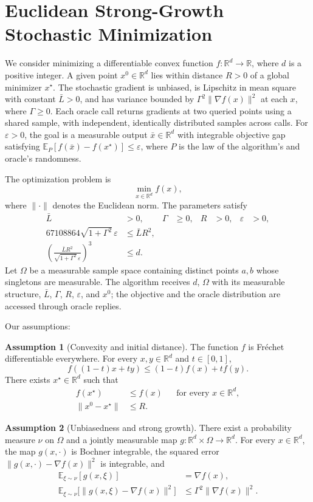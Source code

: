 \documentclass[10pt]{article}
\theoremstyle{definition}
\newtheorem{assumption}{Assumption}
\begin{document}
\section*{Euclidean Strong-Growth Stochastic Minimization}
We consider minimizing a differentiable convex function $f:\mathbb{R}^d\to\mathbb{R}$, where $d$ is a positive integer. A given point $x^0\in\mathbb{R}^d$ lies within distance $R>0$ of a global minimizer $x^\star$. The stochastic gradient is unbiased, is Lipschitz in mean square with constant $\bar{L}>0$, and has variance bounded by $\Gamma^2\|\nabla f(x)\|^2$ at each $x$, where $\Gamma\geq0$. Each oracle call returns gradients at two queried points using a shared sample, with independent, identically distributed samples across calls. For $\varepsilon>0$, the goal is a measurable output $\bar{x}\in\mathbb{R}^d$ with integrable objective gap satisfying $\mathbb{E}_{P}[f(\bar{x})-f(x^\star)]\leq\varepsilon$, where $P$ is the law of the algorithm's and oracle's randomness.

The optimization problem is
\[
\min_{x\in\mathbb{R}^d} f(x),
\]
where $\|\cdot\|$ denotes the Euclidean norm. The parameters satisfy
\[
\begin{aligned}
\bar{L}&>0, & \Gamma&\geq0, & R&>0, & \varepsilon&>0,\\
67108864\sqrt{1+\Gamma^2}\,\varepsilon
&\leq \bar{L}R^2,\\
\left(\frac{\bar{L}R^2}{\sqrt{1+\Gamma^2}\,\varepsilon}\right)^3
&\leq d.
\end{aligned}
\]
Let $\Omega$ be a measurable sample space containing distinct points $a,b$ whose singletons are measurable. The algorithm receives $d$, $\Omega$ with its measurable structure, $\bar{L}$, $\Gamma$, $R$, $\varepsilon$, and $x^0$; the objective and the oracle distribution are accessed through oracle replies.

Our assumptions:
\begin{assumption}[Convexity and initial distance]
The function $f$ is Fr\'echet differentiable everywhere. For every $x,y\in\mathbb{R}^d$ and $t\in[0,1]$,
\[
f((1-t)x+ty)\leq (1-t)f(x)+t f(y).
\]
There exists $x^\star\in\mathbb{R}^d$ such that
\[
\begin{aligned}
f(x^\star)&\leq f(x) &&\text{for every }x\in\mathbb{R}^d,\\
\|x^0-x^\star\|&\leq R.
\end{aligned}
\]
\end{assumption}

\begin{assumption}[Unbiasedness and strong growth]
There exist a probability measure $\nu$ on $\Omega$ and a jointly measurable map $g:\mathbb{R}^d\times\Omega\to\mathbb{R}^d$. For every $x\in\mathbb{R}^d$, the map $g(x,\cdot)$ is Bochner integrable, the squared error $\|g(x,\cdot)-\nabla f(x)\|^2$ is integrable, and
\[
\begin{aligned}
\mathbb{E}_{\xi\sim\nu}[g(x,\xi)]
&=\nabla f(x),\\
\mathbb{E}_{\xi\sim\nu}
 \bigl[\|g(x,\xi)-\nabla f(x)\|^2\bigr]
&\leq \Gamma^2\|\nabla f(x)\|^2.
\end{aligned}
\]
\end{assumption}
\end{document}
